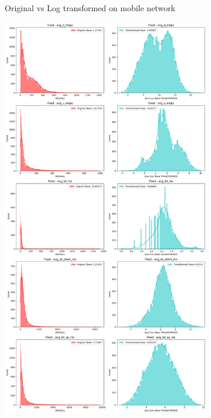 \documentclass[
  letterpaper,
  DIV=11,
  numbers=noendperiod,
  oneside]{scrartcl}
\begin{document}
\begin{figure}
{\begin{figure}[H]
{}

\caption{Original vs Log transformed on mobile network}

\end{figure}

\begin{figure}[H]

{\centering \includegraphics{data-analytics_files/figure-latex/fig-transcomp-output-5.png}

}
\end{figure}}
\end{figure}
\end{document}
